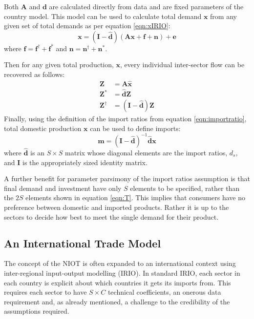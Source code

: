 \documentclass[a4paper]{article}
\begin{document}
Both $\boldsymbol{A}$ and $\boldsymbol{d}$ are calculated directly from data and are fixed parameters of the country model. This model can be used to calculate total demand $\boldsymbol{x}$ from any given set of total demands as per equation \eqref{eqn:xIRIO}:
\begin{equation}
\boldsymbol{x} 
= 
(\boldsymbol{I} - \boldsymbol{\hat{d}})
(
\boldsymbol{Ax} + 
\boldsymbol{f} + \boldsymbol{n}
)
+ \boldsymbol{e}
\label{eqn:xmodel}
\end{equation}
where $\boldsymbol{f} = \boldsymbol{f}^{\dagger} + \boldsymbol{f}^{*}$ and $\boldsymbol{n} = \boldsymbol{n}^{\dagger} + \boldsymbol{n}^{*}$.
 
Then for any given total production, $\boldsymbol{x}$, every individual inter-sector flow can be recovered as follows:
\begin{align}
\boldsymbol{Z}& = \boldsymbol{A}\boldsymbol{\hat{x}}\nonumber\\
\boldsymbol{Z^*}& = \boldsymbol{\hat{d}}\boldsymbol{Z}\\
\boldsymbol{Z^\dagger}& = (\boldsymbol{I} - \boldsymbol{\hat{d}})
	\boldsymbol{Z}\label{eqn:zstar}
\end{align}
Finally, using the definition of the import ratios from equation \eqref{eqn:importratio}, total domestic production $\boldsymbol{x}$ can be used to define imports:
\begin{equation}
\boldsymbol{m} = 
(\boldsymbol{I} - 
\boldsymbol{\hat{d}})^{-1} 
\boldsymbol{\hat{d}}\boldsymbol{x}\label{eqn:mmodel}
\end{equation}
where $\boldsymbol{\hat{d}}$ is an $S \times S$ matrix whose diagonal elements are the import ratios, $d_s$, and $\boldsymbol{I}$ is the appropriately sized identity matrix.

A further benefit for parameter parsimony of the import ratios assumption is that final demand and investment have only $S$ elements to be specified, rather than the $2S$ elements shown in equation \eqref{eqn:T}.
This implies that consumers have no preference between domestic and imported products.
Rather it is up to the sectors to decide how best to meet the single demand for their product.

\subsection{An International Trade Model}\label{sec:trade}
The concept of the NIOT is often expanded to an international context using inter-regional input-output modelling (IRIO). In standard IRIO, each sector in each country is explicit about which countries it gets its imports from. 
This requires each sector to have $S \times C$ technical coefficients, an onerous data requirement and, as already mentioned, a challenge to the credibility of the assumptions required. 
\end{document}
